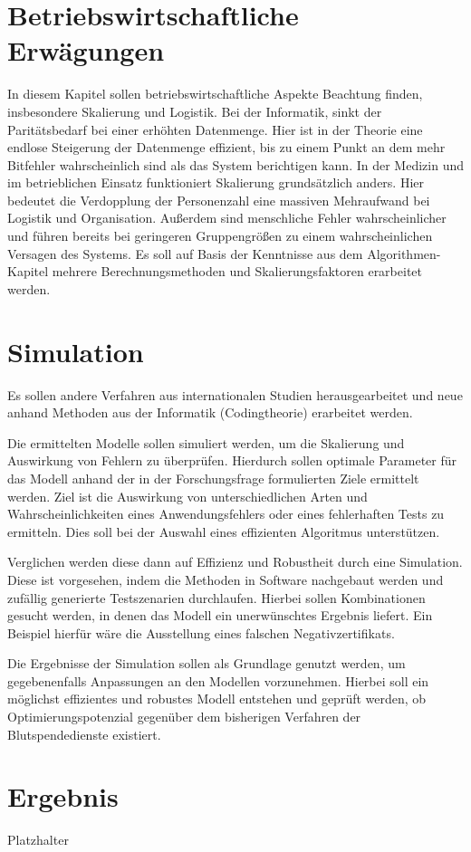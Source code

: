 \section{Betriebswirtschaftliche Erwägungen}
In diesem Kapitel sollen betriebswirtschaftliche Aspekte Beachtung finden, insbesondere Skalierung und Logistik.
Bei der Informatik, sinkt der Paritätsbedarf bei einer erhöhten Datenmenge.
Hier ist in der Theorie eine endlose Steigerung der Datenmenge effizient, bis zu einem Punkt an dem mehr Bitfehler wahrscheinlich sind als das System berichtigen kann.
In der Medizin und im betrieblichen Einsatz funktioniert Skalierung grundsätzlich anders.
Hier bedeutet die Verdopplung der Personenzahl eine massiven Mehraufwand bei Logistik und Organisation.
Außerdem sind menschliche Fehler wahrscheinlicher und führen bereits bei geringeren Gruppengrößen zu einem wahrscheinlichen Versagen des Systems.
Es soll auf Basis der Kenntnisse aus dem Algorithmen-Kapitel mehrere Berechnungsmethoden und Skalierungsfaktoren erarbeitet werden.

\section{Simulation}
Es sollen andere Verfahren aus internationalen Studien herausgearbeitet und neue anhand Methoden aus der Informatik (Codingtheorie) erarbeitet werden. 

Die ermittelten Modelle sollen simuliert werden, um die Skalierung und Auswirkung von Fehlern zu überprüfen.
Hierdurch sollen optimale Parameter für das Modell anhand der in der Forschungsfrage formulierten Ziele ermittelt werden.
Ziel ist die Auswirkung von unterschiedlichen Arten und Wahrscheinlichkeiten eines Anwendungsfehlers oder eines fehlerhaften Tests zu ermitteln.
Dies soll bei der Auswahl eines effizienten Algoritmus unterstützen.

Verglichen werden diese dann auf Effizienz und Robustheit durch eine Simulation.
Diese ist vorgesehen, indem die Methoden in Software nachgebaut werden und zufällig generierte Testszenarien durchlaufen.
Hierbei sollen Kombinationen gesucht werden, in denen das Modell ein unerwünschtes Ergebnis liefert.
Ein Beispiel hierfür wäre die Ausstellung eines falschen Negativzertifikats.

Die Ergebnisse der Simulation sollen als Grundlage genutzt werden, um gegebenenfalls Anpassungen an den Modellen vorzunehmen.
Hierbei soll ein möglichst effizientes und robustes Modell entstehen und geprüft werden, ob Optimierungspotenzial gegenüber dem bisherigen Verfahren der Blutspendedienste existiert.

\section{Ergebnis}
Platzhalter
